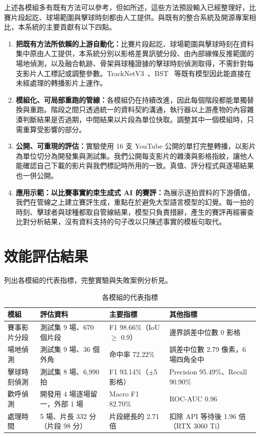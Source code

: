 上述各模組多有既有方法可以參考，但如所述，這些方法預設輸入已經整理好，比賽片段起訖、球場範圍與擊球時刻都由人工提供。與既有的整合系統及開源專案相比，本系統的主要貢獻有以下四點。

\begin{enumerate}
  \item \textbf{把既有方法所依賴的上游自動化：}比賽片段起訖、球場範圍與擊球時刻在資料集中原由人工提供，本系統分別以影格差異訊號分段、由內部線條反推範圍的場地偵測，以及融合軌跡、骨架與球種證據的擊球時刻偵測取得，不需針對每支影片人工標記或調整參數。TrackNetV3~\cite{tracknetv3}、BST~\cite{bst} 等既有模型因此能直接在未經處理的轉播影片上運作。
  \item \textbf{模組化、可局部重跑的管線：}各模組仍在持續改進，因此每個階段都能單獨替換與重跑。階段之間只透過統一的資料契約溝通，執行器以上游產物的內容雜湊判斷結果是否過期，中間結果以片段為單位快取。調整其中一個模組時，只需重算受影響的部分。
  \item \textbf{公開、可重現的評估：}實驗使用 16 支 YouTube 公開的單打完整轉播，以影片為單位切分為開發集與測試集。我們公開每支影片的雜湊與影格指紋，讓他人能確認自己下載的影片與我們標記時所用的一致。真值、評分程式與逐場結果也一併公開。
  \item \textbf{應用示範：以比賽事實約束生成式 AI 的賽評：}為展示逐拍資料的下游價值，我們在管線之上建立賽評生成，重點在於避免大型語言模型的幻覺。每一拍的時刻、擊球者與球種都取自管線結果，模型只負責措辭，產生的賽評再經審查比對分析結果，沒有資料支持的句子改以只陳述事實的模板句取代。
\end{enumerate}

\section{效能評估結果}
\label{sec:results-summary}

列出各模組的代表指標，完整實驗與失敗案例分析見。

\begin{table}[htbp]
  \centering
  \small
  \caption{各模組的代表指標}
  \label{tab:results-summary}
  \begin{tabularx}{\linewidth}{|l|L|l|L|}
    \hline
    模組 & 評估資料 & 主要指標 & 其他指標 \\ \hline
    賽事影片分段 & 測試集 9 場、670 個片段 & F1 98.66\%（IoU $\geq$ 0.9） & 邊界誤差中位數 0 影格 \\ \hline
    場地偵測 & 測試集 9 場、36 個外角 & 命中率 72.22\% & 誤差中位數 2.79 像素，6 場四角全中 \\ \hline
    擊球時刻偵測 & 測試集 8 場、6,990 拍 & F1 93.14\%（$\pm$5 影格） & Precision 95.49\%、Recall 90.90\% \\ \hline
    歡呼偵測 & 開發用 4 場逐場留一，外部 1 場 & Macro F1 82.70\% & ROC-AUC 0.96 \\ \hline
    處理時間 & 5 場、片長 332 分（片段 98 分） & 片段總長的 2.71 倍 & 扣除 API 等待後 1.96 倍（RTX 3060 Ti） \\ \hline
  \end{tabularx}
\end{table}

